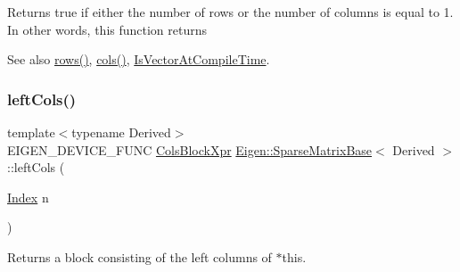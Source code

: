 \begin{DoxyReturn}{Returns}
true if either the number of rows or the number of columns is equal to 1. In other words, this function returns 
\begin{DoxyCode}{0}
\end{DoxyCode}
 
\end{DoxyReturn}
\begin{DoxySeeAlso}{See also}
\mbox{\hyperlink{class_eigen_1_1_sparse_matrix_base_a1944e9fa9ce7937bfc3a87b2cb94371f}{rows()}}, \mbox{\hyperlink{class_eigen_1_1_sparse_matrix_base_aca7ce296424ef6e478ab0fb19547a7ee}{cols()}}, \mbox{\hyperlink{class_eigen_1_1_sparse_matrix_base_a11b30ed44f64a137b4fa1ee638ca2d36a14a3f566ed2a074beddb8aef0223bfdf}{Is\+Vector\+At\+Compile\+Time}}. 
\end{DoxySeeAlso}
\mbox{\label{class_eigen_1_1_sparse_matrix_base_a9df32a7c2b6276259c05c996aaa929a8}} 
\subsubsection{\texorpdfstring{leftCols()}{leftCols()}\hspace{0.1cm}{\footnotesize\ttfamily [1/2]}}
{\footnotesize\ttfamily template$<$typename Derived$>$ \\
E\+I\+G\+E\+N\+\_\+\+D\+E\+V\+I\+C\+E\+\_\+\+F\+U\+NC \mbox{\hyperlink{class_eigen_1_1_block}{Cols\+Block\+Xpr}} \mbox{\hyperlink{class_eigen_1_1_sparse_matrix_base}{Eigen\+::\+Sparse\+Matrix\+Base}}$<$ Derived $>$\+::left\+Cols (\begin{DoxyParamCaption}\item[{\mbox{\hyperlink{struct_eigen_1_1_eigen_base_a554f30542cc2316add4b1ea0a492ff02}{Index}}}]{n }\end{DoxyParamCaption})\hspace{0.3cm}{\ttfamily [inline]}}

\begin{DoxyReturn}{Returns}
a block consisting of the left columns of $\ast$this.
\end{DoxyReturn}

